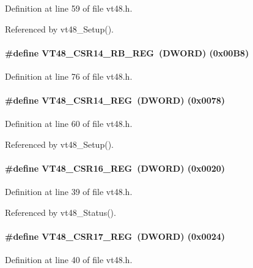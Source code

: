 Definition at line 59 of file vt48.h.

Referenced by vt48\_\-Setup().
\paragraph[{VT48\_\-CSR14\_\-RB\_\-REG}]{\setlength{\rightskip}{0pt plus 5cm}\#define VT48\_\-CSR14\_\-RB\_\-REG~({\bf DWORD}) (0x00B8)}\hfill\label{vt48_8h_af133808fbb3f904ccfa45c076bf4dc9a}


Definition at line 76 of file vt48.h.
\paragraph[{VT48\_\-CSR14\_\-REG}]{\setlength{\rightskip}{0pt plus 5cm}\#define VT48\_\-CSR14\_\-REG~({\bf DWORD}) (0x0078)}\hfill\label{vt48_8h_a0391b7a0eeca705402b7169348552c34}


Definition at line 60 of file vt48.h.

Referenced by vt48\_\-Setup().
\paragraph[{VT48\_\-CSR16\_\-REG}]{\setlength{\rightskip}{0pt plus 5cm}\#define VT48\_\-CSR16\_\-REG~({\bf DWORD}) (0x0020)}\hfill\label{vt48_8h_a980384d2d6386a280c0ea6c95aea550b}


Definition at line 39 of file vt48.h.

Referenced by vt48\_\-Status().
\paragraph[{VT48\_\-CSR17\_\-REG}]{\setlength{\rightskip}{0pt plus 5cm}\#define VT48\_\-CSR17\_\-REG~({\bf DWORD}) (0x0024)}\hfill\label{vt48_8h_ae72ad5bcf8c05c6f94268def9b4e9d33}


Definition at line 40 of file vt48.h.
